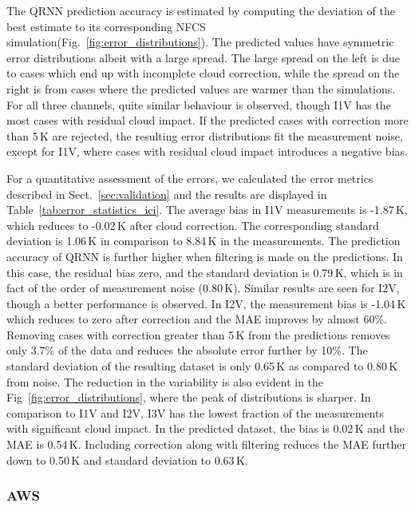 \documentclass[amt, manuscript]{copernicus}
\begin{document}
The QRNN prediction accuracy is estimated by computing the deviation of the best estimate to its corresponding NFCS simulation(Fig.~\ref{fig:error_distributions}). The predicted values have symmetric error distributions albeit with a large spread. The large spread on the left is due to cases which end up with incomplete cloud correction, while the spread on the right is from cases where the predicted values are warmer than the simulations. For all three channels, quite similar behaviour is observed, though I1V has the most cases with residual cloud impact. If the predicted cases with correction more than 5\,K are rejected, the resulting error distributions fit the measurement noise, except for I1V, where cases with residual cloud impact introduces a negative bias. 

For a quantitative assessment of the errors, we calculated the error metrics described in Sect.~\ref{sec:validation} and the results are displayed in Table~\ref{tab:error_statistics_ici}. The average bias in I1V measurements is -1.87\,K, which reduces to -0.02\,K after cloud correction. The corresponding standard deviation is 1.06\,K in comparison to 8.84\,K in the measurements. The prediction accuracy of QRNN is further higher when filtering is made on the predictions. In this case, the residual bias zero, and the standard deviation is 0.79\,K, which is in fact of the order of measurement noise (0.80\,K). Similar results are seen for I2V, though a better performance is observed. In I2V, the measurement bias is -1.04\,K which reduces to zero after correction and the MAE improves by almost 60\%. Removing cases with correction greater than 5\,K from the predictions removes only 3.7\% of the data and reduces the absolute error further by 10\%. The standard deviation of the resulting dataset is only 0.65\,K as compared to 0.80\,K from noise. The reduction in the variability is also evident in the Fig~\ref{fig:error_distributions}, where the peak of distributions is sharper. In comparison to I1V and I2V, I3V has the lowest fraction of the measurements with significant cloud impact. In the predicted dataset, the bias is 0.02\,K and the MAE is 0.54\,K. Including correction along with filtering reduces the MAE further down to 0.50\,K and standard deviation to 0.63\,K.  

\subsubsection{AWS}
\end{document}
